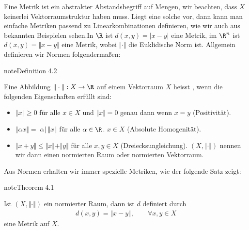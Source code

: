 \documentclass[letterpaper,10pt,english]{jupyterBook}
\begin{document}
Eine Metrik ist ein abstrakter Abstandsbegriff auf Mengen, wir beachten, dass \(X\) keinerlei Vektorraumstruktur haben muss.  Liegt eine solche vor, dann kann man einfache Metriken passend zu Linearkombinationen definieren, wie wir auch aus bekannten Beispielen sehen.In \(\R\) ist \(d(x,y) = |x-y|\) eine Metrik, im \(\R^n\) ist \(d(x,y) = \Vert x -y \Vert \) eine Metrik, wobei \(\Vert \cdot \Vert\) die Euklidische Norm ist. Allgemein definieren wir Normen folgendermaßen:
\label{metrik/normen:definition-1}
\begin{sphinxadmonition}{note}{Definition 4.2}



Eine Abbildung \(\Vert \cdot \Vert:X\rightarrow \R\) auf einem Vektorraum \(X\) heisst , wenn die folgenden Eigenschaften erfüllt sind:
\begin{itemize}
\item {} 
\(\Vert x \Vert \geq 0\) für alle \(x \in X\) und \(\Vert x \Vert = 0\) genau dann wenn \(x=y\) (Positivität).

\item {} 
\(\Vert \alpha x \Vert = |\alpha|~\Vert x \Vert\) für alle \(\alpha \in \R\). \(x\in X\)  (Absolute Homogenität).

\item {} 
\(\Vert x+y \Vert \leq\Vert x  \Vert + \Vert y  \Vert\) für alle \(x,y  \in X\)  (Dreiecksungleichung).
\((X,\Vert \cdot \Vert)\)  nennen wir dann einen normierten Raum oder normierten Vektorraum.

\end{itemize}
\end{sphinxadmonition}

Aus Normen erhalten wir immer spezielle Metriken, wie der folgende Satz zeigt:
\label{metrik/normen:theorem-2}
\begin{sphinxadmonition}{note}{Theorem 4.1}



Ist \((X,\Vert \cdot \Vert)\) ein normierter Raum, dann ist \(d\) definiert durch
\begin{equation*}
\begin{split} d(x,y) = \Vert x - y \Vert ,\qquad \forall x,y \in X\end{split}
\end{equation*}
eine Metrik auf \(X\).
\end{sphinxadmonition}
\end{document}

